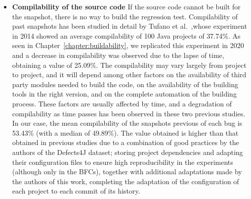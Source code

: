 \begin{itemize}
\item \textbf{Compilability of the source code} If the source code cannot be built for the snapshot, there is no way to build the regression test. 
Compilability of past snapshots has been studied in detail by Tufano et al.~\cite{tufano2017there},whose experiment in 2014 showed an average compilability of 100 Java projects of 37.74\%. 
As seen in Chapter~\ref{chapter:buildability}, we replicated this experiment in 2020 and a decrease in compilability was observed due to the lapse of time, 
obtaining a value of 25.09\%. The compilability may vary largely from project to project, and it will depend among other factors on the availability of third party modules needed to build the code, on the availability of the building tools in the right version, and on the complete automation of the building process. These factors are usually affected by time, and a degradation of compilability as time passes has been observed in these two previous studies.
In our case, the mean compilability of the snapshots previous of each bug is 53.43\% (with a median of 49.89\%). 
The value obtained is higher than that obtained in previous studies due to a combination of good practices by the authors of the Defects4J dataset; 
storing project dependencies and adapting their configuration files to ensure high reproducibility in the experiments (although only in the BFCs), together with additional adaptations made by the authors of this work, completing the adaptation of the configuration of each project to each commit of its history.

\end{itemize}
